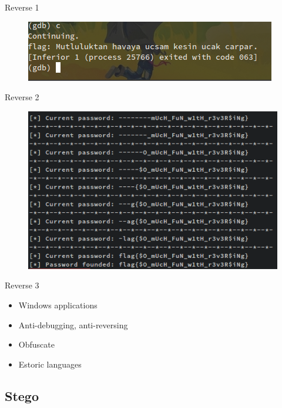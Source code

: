 \documentclass[compress]{beamer}
\begin{document}
\begin{frame}{Reverse 1}
      \begin{figure}
          \centering
          \includegraphics[width=\textwidth]{images/r12.png}
      \end{figure} 
\end{frame}

\begin{frame}{Reverse 2}
	\begin{figure}
		\centering
		\includegraphics[width=\textwidth]{images/r21.png}
	\end{figure}
\end{frame}

\begin{frame}{Reverse 3}

\begin{itemize}
	\item Windows applications
    \item Anti-debugging, anti-reversing
    \item Obfuscate
    \item Estoric languages
\end{itemize}

\end{frame}

\subsection{Stego}
\end{document}
